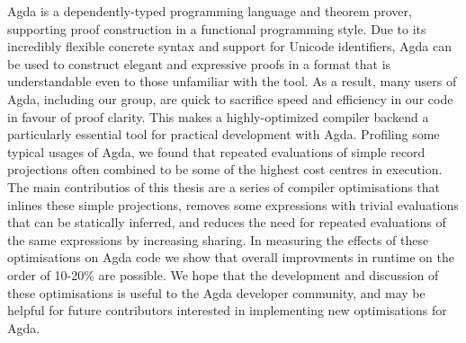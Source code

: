 Agda is a dependently-typed programming language and theorem prover, supporting proof construction in a functional programming style. Due to its incredibly flexible concrete syntax and support for Unicode identifiers, Agda can be used to construct elegant and expressive proofs in a format that is understandable even to those unfamiliar with the tool. As a result, many users of Agda, including our group, are quick to sacrifice speed and efficiency in our code in favour of proof clarity. This makes a highly-optimized compiler backend a particularly essential tool for practical development with Agda. Profiling some typical usages of Agda, we found that repeated evaluations of simple record projections often combined to be some of the highest cost centres in execution. The main contributios of this thesis are a series of compiler optimisations that inlines these simple projections, removes some expressions with trivial evaluations that can be statically inferred, and reduces the need for repeated evaluations of the same expressions by increasing sharing. In measuring the effects of these optimisations on Agda code we show that overall improvments in runtime on the order of 10-20\% are possible. We hope that the development and discussion of these optimisations is useful to the Agda developer community, and may be helpful for future contributors interested in implementing new optimisations for Agda.
